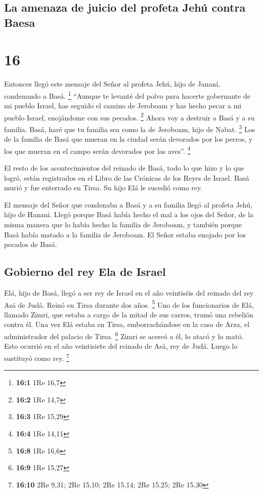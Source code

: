 \hypertarget{la-amenaza-de-juicio-del-profeta-jehuxfa-contra-baesa}{%
\subsection{La amenaza de juicio del profeta Jehú contra
Baesa}\label{la-amenaza-de-juicio-del-profeta-jehuxfa-contra-baesa}}

\hypertarget{section-15}{%
\section{16}\label{section-15}}

 Entonces llegó este mensaje del Señor al profeta Jehú,
hijo de Jananí, condenando a Basá. \footnote{\textbf{16:1} 1Re 16,7}
 ``Aunque te levanté del polvo para hacerte gobernante de
mi pueblo Israel, has seguido el camino de Jeroboam y has hecho pecar a
mi pueblo Israel, enojándome con sus pecados. \footnote{\textbf{16:2}
  1Re 14,7}  Ahora voy a destruir a Basá y a su familia.
Basá, haré que tu familia sea como la de Jeroboam, hijo de Nabat.
\footnote{\textbf{16:3} 1Re 15,29}  Los de la familia de
Basá que mueran en la ciudad serán devorados por los perros, y los que
mueran en el campo serán devorados por las aves''. \footnote{\textbf{16:4}
  1Re 14,11}

 El resto de los acontecimientos del reinado de Basá, todo
lo que hizo y lo que logró, están registrados en el Libro de las
Crónicas de los Reyes de Israel.  Basá murió y fue
enterrado en Tirsa. Su hijo Elá le sucedió como rey.

 El mensaje del Señor que condenaba a Basá y a su familia
llegó al profeta Jehú, hijo de Hanani. Llegó porque Basá había hecho el
mal a los ojos del Señor, de la misma manera que lo había hecho la
familia de Jeroboam, y también porque Basá había matado a la familia de
Jeroboam. El Señor estaba enojado por los pecados de Basá.

\hypertarget{gobierno-del-rey-ela-de-israel}{%
\subsection{Gobierno del rey Ela de
Israel}\label{gobierno-del-rey-ela-de-israel}}

 Elá, hijo de Basá, llegó a ser rey de Israel en el año
veintiséis del reinado del rey Asá de Judá. Reinó en Tirsa durante dos
años. \footnote{\textbf{16:8} 1Re 16,6}  Uno de los
funcionarios de Elá, llamado Zimri, que estaba a cargo de la mitad de
sus carros, tramó una rebelión contra él. Una vez Elá estaba en Tirsa,
emborrachándose en la casa de Arza, el administrador del palacio de
Tirsa. \footnote{\textbf{16:9} 1Re 15,27}  Zimri se
acercó a él, lo atacó y lo mató. Esto ocurrió en el año veintisiete del
reinado de Asá, rey de Judá. Luego lo sustituyó como rey. \footnote{\textbf{16:10}
  2Re 9,31; 2Re 15,10; 2Re 15,14; 2Re 15,25; 2Re 15,30}

